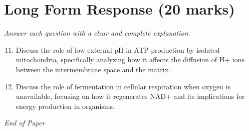\documentclass[12pt]{article}
\begin{document}
\section*{Long Form Response (20 marks)}
\textit{Answer each question with a clear and complete explanation.}
\begin{enumerate}[label=\arabic*.]
\setcounter{enumi}{10}
\item Discuss the role of low external pH in ATP production by isolated mitochondria, specifically analyzing how it affects the diffusion of H+ ions between the intermembrane space and the matrix.
\item Discuss the role of fermentation in cellular respiration when oxygen is unavailable, focusing on how it regenerates NAD+ and its implications for energy production in organisms.
\end{enumerate}

\vfill
\noindent\textit{End of Paper}
\end{document}
